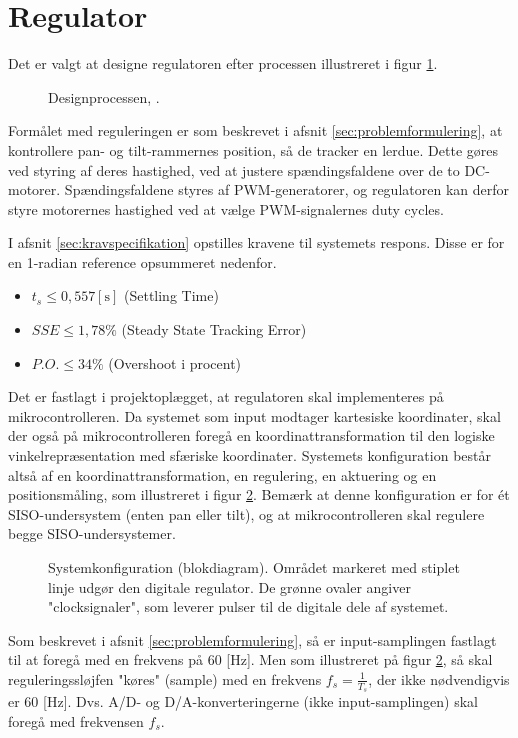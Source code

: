 \section{Regulator}
\label{sec:kontrollerdeign}
Det er valgt at designe regulatoren efter processen illustreret i figur \ref{fig:designproces}.
\begin{figure}[!th]
\centering

\caption[Designprocessen]{Designprocessen, \citep[Side. 260]{reg_modern_control_systems}.}
\label{fig:designproces}
\end{figure}

Formålet med reguleringen er som beskrevet i afsnit \ref{sec:problemformulering},
at kontrollere pan- og tilt-rammernes position, så de tracker en lerdue.
Dette gøres ved styring af deres hastighed, ved at justere spændingsfaldene over de
to DC-motorer. Spændingsfaldene styres af PWM-generatorer, og regulatoren
kan derfor styre motorernes hastighed ved at vælge PWM-signalernes duty cycles.

I afsnit \ref{sec:kravspecifikation} opstilles kravene til systemets respons.
Disse er for en 1-radian reference opsummeret nedenfor.
\begin{itemize}
\item \(t_{s} \leq 0,557 \mathrm{\left[s\right]}\) (Settling Time)
\item \(SSE \leq 1,78 \%\) (Steady State Tracking Error)
\item \(P.O. \leq 34 \%\) (Overshoot i procent)
\end{itemize}

Det er fastlagt i projektoplægget, at regulatoren skal implementeres på mikrocontrolleren.
Da systemet som input modtager kartesiske koordinater,
skal der også på mikrocontrolleren foregå en koordinattransformation
til den logiske vinkelrepræsentation med sfæriske koordinater.
Systemets konfiguration består altså af en koordinattransformation,
en regulering, en aktuering og en positionsmåling, som illustreret
i figur \ref{fig:digitalkontroller1}.
Bemærk at denne konfiguration er for ét SISO-undersystem (enten pan eller tilt),
og at mikrocontrolleren skal regulere begge SISO-undersystemer.
\begin{figure}[!th]
\centering
\begin{tikzpicture}[auto, node distance=2.6cm,>=latex']

\end{tikzpicture}
\caption[Systemkonfiguration]{Systemkonfiguration (blokdiagram).
	Området markeret med stiplet linje udgør den digitale regulator.
	De grønne ovaler angiver "clocksignaler", som leverer pulser til de digitale dele af systemet.}
\label{fig:digitalkontroller1}
\end{figure}
Som beskrevet i afsnit \ref{sec:problemformulering},
så er input-samplingen fastlagt til at foregå med en frekvens på 60 [Hz].
Men som illustreret på figur \ref{fig:digitalkontroller1}, så skal reguleringssløjfen
"køres" (sample) med en frekvens \(f_s=\frac{1}{T_s}\), der ikke nødvendigvis er 60 [Hz].
Dvs. A/D- og D/A-konverteringerne (ikke input-samplingen) skal foregå med frekvensen \(f_s\).

